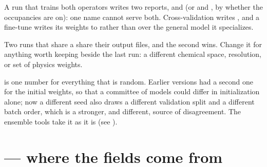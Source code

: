 A run that trains both operators writes two reports,  and  (or  and , by whether the occupancies are on): one name cannot serve both. Cross-validation writes , and a fine-tune writes its weights to  rather than over the general model it specializes.

\begin{pwarn}
Two runs that share a  share their output files, and the second wins. Change it for anything worth keeping beside the last run: a different chemical space, resolution, or set of physics weights.
\end{pwarn}

 is one number for everything that is random. Earlier versions had a second one for the initial weights, so that a committee of models could differ in initialization alone; now a different seed also draws a different validation split and a different batch order, which is a stronger, and different, source of disagreement. The ensemble tools take it as it is (see ).

\section{ --- where the fields come from}

